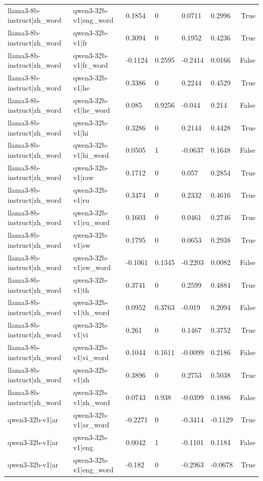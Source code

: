 \begin{table}
\begin{tabular}{llllllr}
llama3-8b-instruct|zh_word & qwen3-32b-v1|eng_word & 0.1854 & 0 & 0.0711 & 0.2996 & True \\
llama3-8b-instruct|zh_word & qwen3-32b-v1|fr & 0.3094 & 0 & 0.1952 & 0.4236 & True \\
llama3-8b-instruct|zh_word & qwen3-32b-v1|fr_word & -0.1124 & 0.2595 & -0.2414 & 0.0166 & False \\
llama3-8b-instruct|zh_word & qwen3-32b-v1|he & 0.3386 & 0 & 0.2244 & 0.4529 & True \\
llama3-8b-instruct|zh_word & qwen3-32b-v1|he_word & 0.085 & 0.9256 & -0.044 & 0.214 & False \\
llama3-8b-instruct|zh_word & qwen3-32b-v1|hi & 0.3286 & 0 & 0.2144 & 0.4428 & True \\
llama3-8b-instruct|zh_word & qwen3-32b-v1|hi_word & 0.0505 & 1 & -0.0637 & 0.1648 & False \\
llama3-8b-instruct|zh_word & qwen3-32b-v1|raw & 0.1712 & 0 & 0.057 & 0.2854 & True \\
llama3-8b-instruct|zh_word & qwen3-32b-v1|ru & 0.3474 & 0 & 0.2332 & 0.4616 & True \\
llama3-8b-instruct|zh_word & qwen3-32b-v1|ru_word & 0.1603 & 0 & 0.0461 & 0.2746 & True \\
llama3-8b-instruct|zh_word & qwen3-32b-v1|sw & 0.1795 & 0 & 0.0653 & 0.2938 & True \\
llama3-8b-instruct|zh_word & qwen3-32b-v1|sw_word & -0.1061 & 0.1345 & -0.2203 & 0.0082 & False \\
llama3-8b-instruct|zh_word & qwen3-32b-v1|th & 0.3741 & 0 & 0.2599 & 0.4884 & True \\
llama3-8b-instruct|zh_word & qwen3-32b-v1|th_word & 0.0952 & 0.3763 & -0.019 & 0.2094 & False \\
llama3-8b-instruct|zh_word & qwen3-32b-v1|vi & 0.261 & 0 & 0.1467 & 0.3752 & True \\
llama3-8b-instruct|zh_word & qwen3-32b-v1|vi_word & 0.1044 & 0.1611 & -0.0099 & 0.2186 & False \\
llama3-8b-instruct|zh_word & qwen3-32b-v1|zh & 0.3896 & 0 & 0.2753 & 0.5038 & True \\
llama3-8b-instruct|zh_word & qwen3-32b-v1|zh_word & 0.0743 & 0.938 & -0.0399 & 0.1886 & False \\
qwen3-32b-v1|ar & qwen3-32b-v1|ar_word & -0.2271 & 0 & -0.3414 & -0.1129 & True \\
qwen3-32b-v1|ar & qwen3-32b-v1|eng & 0.0042 & 1 & -0.1101 & 0.1184 & False \\
qwen3-32b-v1|ar & qwen3-32b-v1|eng_word & -0.182 & 0 & -0.2963 & -0.0678 & True \\

\end{tabular}
\end{table}
